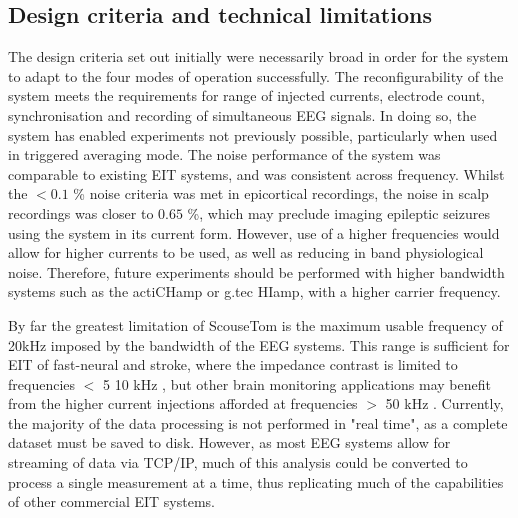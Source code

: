 \subsection{Design criteria and technical limitations}
The design criteria set out initially were necessarily broad in order for the system to adapt to the four modes of operation successfully. The reconfigurability of the system meets the requirements for range of injected currents, electrode count, synchronisation and recording of simultaneous EEG signals. In doing so, the system has enabled experiments not previously possible, particularly when used in triggered averaging mode. The noise performance of the system was comparable to existing EIT systems, and was consistent across frequency. Whilst the  $<0.1$ \% noise criteria was met in epicortical recordings, the noise in scalp recordings was closer to $0.65$ \%, which may preclude imaging epileptic seizures using the system in its current form. However, use of a higher frequencies would allow for higher currents to be used, as well as reducing in band physiological noise. Therefore, future experiments should be performed with higher bandwidth systems such as the actiCHamp or g.tec HIamp, with a higher carrier frequency. 

By far the greatest limitation of ScouseTom is the maximum usable frequency of 20kHz imposed by the bandwidth of the EEG systems. This range is sufficient for EIT of fast-neural and stroke, where the impedance contrast is limited to frequencies $<$ 5 10 kHz \cite{Malone2014a,Aristovich_2016,Vongerichten_2016}, but other brain monitoring applications may benefit from the higher current injections afforded at frequencies $>$ 50 kHz \cite{Fabrizi_2006,fu2014use}. Currently, the majority of the data processing is not performed in "real time", as a complete dataset must be saved to disk. However, as most EEG systems allow for streaming of data via TCP/IP, much of this analysis could be converted to process a single measurement at a time, thus replicating much of the capabilities of other commercial EIT systems.
